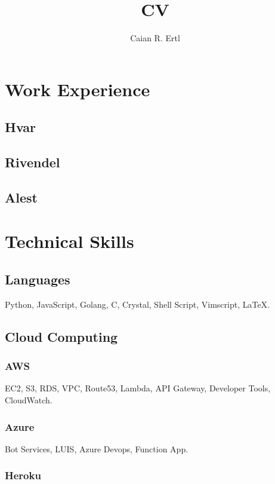 \documentclass{article}
\renewcommand{\maketitle} {
    \begin{center}
    \bfseries
    \huge
    \theauthor
    \end{center}
}
\begin{document}
    \title{CV}
    \author{Caian R. Ertl}

    \maketitle

    \section{Work Experience}

        \subsection{Hvar}
        \subsection{Rivendel}
        \subsection{Alest}

    \section{Technical Skills}

        \subsection{Languages}
        Python, JavaScript, Golang, C, Crystal, Shell Script, Vimscript, {\LaTeX}.

        \subsection{Cloud Computing}

            \subsubsection{AWS}
            EC2, S3, RDS, VPC, Route53, Lambda, API Gateway, Developer Tools, CloudWatch.

            \subsubsection{Azure}
            Bot Services, LUIS, Azure Devops, Function App.

            \subsubsection{Heroku}
\end{document}
